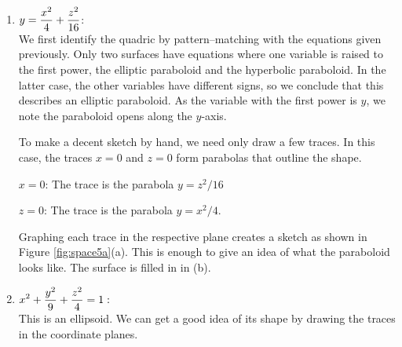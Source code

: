 {\begin{enumerate}
	\item $\displaystyle y=\frac{x^2}{4}+\frac{z^2}{16}$:\\[5pt]
	We first identify the quadric by pattern--matching with the equations given previously. Only two surfaces have equations where one variable is raised to the first power, the elliptic paraboloid and the hyperbolic paraboloid. In the latter case, the other variables have different signs, so we conclude that this describes an elliptic paraboloid. As the variable with the first power is $y$, we note the paraboloid opens along the $y$-axis. 
	
	To make a decent sketch by hand, we need only draw a few traces. In this case, the traces $x=0$ and $z=0$ form parabolas that outline the shape.
	
	$x=0$:	The trace is the parabola $y=z^2/16$
	
	$z=0$: 	The trace is the parabola $y=x^2/4$.
	
	Graphing each trace in the respective plane creates a sketch as shown in Figure \ref{fig:space5a}(a). This is enough to give an idea of what the paraboloid looks like. The surface is filled in in (b).
	
	\item		$\displaystyle x^2+\frac{y^2}{9}+\frac{z^2}{4}=1:$\\[5pt]
	This is an ellipsoid. We can get a good idea of its shape by drawing the traces in the coordinate planes.
	

\end{enumerate}}
